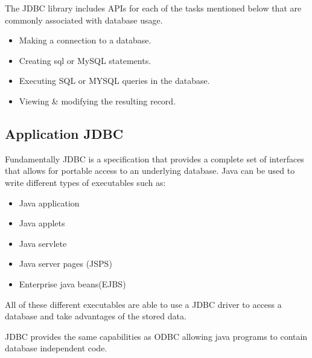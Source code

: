 \documentclass[twocolumn, a4paper]{article}
\begin{document}
The JDBC library includes APIs for each of the tasks mentioned below that are
commonly associated with database usage.
\begin{itemize}
  \item Making a connection to a database.
  \item Creating sql or MySQL statements.
  \item Executing SQL or MYSQL queries in the database.
  \item Viewing \& modifying the resulting record.
\end{itemize}

\subsection{Application JDBC}
Fundamentally JDBC is a specification that provides a complete set of
interfaces that allows for portable access to an underlying database. Java can
be used to write different types of executables such as:
\begin{itemize}
  \item Java application
  \item Java applets
  \item Java servlete
  \item Java server pages (JSPS)
  \item Enterprise java beans(EJBS)
\end{itemize}
All of these different executables are able to use a JDBC driver to access a
database and take advantages of the stored data.

JDBC provides the same capabilities as ODBC allowing java programs to contain
database independent code.
\end{document}

